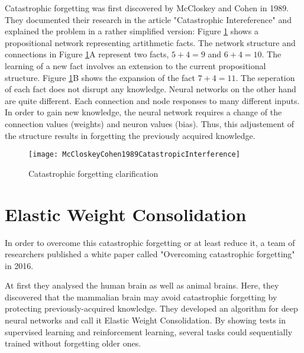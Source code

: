 Catastrophic forgetting was first discovered by McCloskey and Cohen in 1989.
They documented their research in the article "Catastrophic Intereference" \cite{psychology_learning_mccloskey_cohen} and explained the problem in a rather simplified version:
\cite{psychology_learning_mccloskey_cohen}
\newline
Figure \ref{fig:catastrophic_forgetting_clarification} shows a propositional network representing artithmetic facts.
The network structure and connections in Figure \ref{fig:catastrophic_forgetting_clarification}A represent two facts, $5 + 4 = 9$ and $6 + 4 = 10$.
The learning of a new fact involves an extension to the current propositional structure.
Figure \ref{fig:catastrophic_forgetting_clarification}B shows the expansion of the fact $7 + 4 = 11$.
The seperation of each fact does not disrupt any knowledge.
\cite{psychology_learning_mccloskey_cohen}
\newline
Neural networks on the other hand are quite different.
Each connection and node responses to many different inputs.
In order to gain new knowledge, the neural network requires a change of the connection values (weights) and neuron values (bias).
Thus, this adjustement of the structure results in forgetting the previously acquired knowledge.
\cite{psychology_learning_mccloskey_cohen}

\begin{figure}[H]
    \centering
    \texttt{[image: McCloskeyCohen1989CatastropicInterference]}
    \caption{\cite[page 148]{psychology_learning_mccloskey_cohen} Catastrophic forgetting clarification}
    \label{fig:catastrophic_forgetting_clarification}
\end{figure}

\section{Elastic Weight Consolidation}
\label{foundation_ewc}

In order to overcome this catastrophic forgetting or at least reduce it, a team of researchers published a white paper called "Overcoming catastrophic forgetting" in 2016.
\cite{elastic-weight-consolidation}

At first they analysed the human brain as well as animal brains.
Here, they discovered that the mammalian brain may avoid catastrophic forgetting by protecting previously-acquired knowledge.
They developed an algorithm for deep neural networks and call it Elastic Weight Consolidation.
By showing tests in supervised learning and reinforcement learning, several tasks could sequentially trained without forgetting older ones.
\cite{elastic-weight-consolidation}

